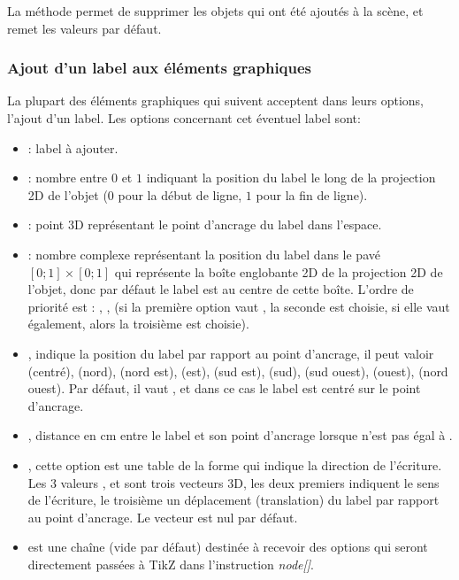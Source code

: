 La méthode  permet de supprimer les objets qui ont été ajoutés à la scène, et remet les valeurs par défaut.

\subsubsection{Ajout d'un label aux éléments graphiques}\label{addlabel}

La plupart des éléments graphiques qui suivent acceptent dans leurs options, l'ajout d'un label. Les options concernant cet éventuel label sont:

\begin{itemize}
    \item {} : label à ajouter.
    
    \item {} : nombre entre $0$ et $1$ indiquant la position du label le long de la projection 2D de l'objet ($0$ pour la début de ligne, $1$ pour la fin de ligne).
    
    \item {} : point 3D représentant le point d'ancrage du label dans l'espace.
    
    \item {} : nombre complexe représentant la position du label dans le pavé $[0;1]\times[0;1]$ qui représente la boîte englobante 2D de la projection 2D de l'objet, donc par défaut le label est au centre de cette boîte.
    L'ordre de priorité est : , ,  (si la première option vaut \nil, la seconde est choisie, si elle vaut \nil également, alors la troisième est choisie).
    
    \item {}, indique la position du label par rapport au point d'ancrage, il peut valoir  (centré),  (nord),  (nord est),  (est),  (sud est),  (sud),  (sud ouest),  (ouest),  (nord ouest). Par défaut, il vaut , et dans ce cas le label est centré sur le point d'ancrage.
    
    \item {}, distance en cm entre le label et son point d'ancrage lorsque  n'est pas égal à .
    
    \item {}, cette option est une table de la forme  qui indique la direction de l'écriture. Les 3 valeurs ,  et  sont trois  vecteurs 3D, les deux premiers indiquent le sens de l'écriture, le troisième un déplacement (translation) du label par rapport au point d'ancrage. Le vecteur  est nul par défaut.
    
    \item {} est une chaîne (vide par défaut) destinée à recevoir des options qui seront directement passées à TikZ dans l'instruction \emph{node[]}.
\end{itemize}


